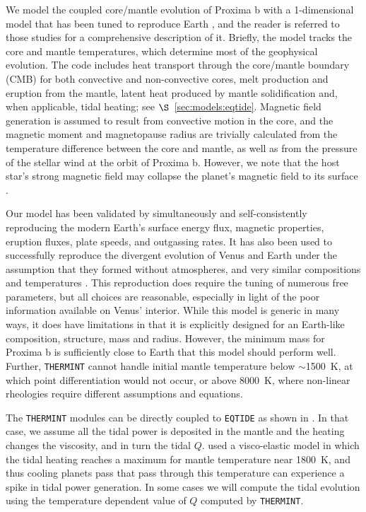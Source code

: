 \documentclass[preprint,12pt]{aastex}
\def\eqtide{\texttt{\footnotesize{EQTIDE}}\xspace}
\def\thermint{\texttt{\footnotesize{THERMINT}}\xspace}
\begin{document}
We model the coupled core/mantle evolution of Proxima b with a
1-dimensional model that has been tuned to reproduce Earth
\citep{DriscollBercovici14,DriscollBarnes15}, and the
reader is referred to those studies for a comprehensive description of
it. Briefly, the model tracks the core and mantle
temperatures, which determine most of the geophysical evolution. The code
includes heat transport through the core/mantle boundary (CMB) for
both convective and non-convective cores, melt production and eruption
from the mantle, latent heat produced by mantle solidification and,
when applicable, tidal heating; see $\S$~\ref{sec:models:eqtide}. Magnetic field
generation is assumed to result from convective motion in the core,
and the magnetic moment and magnetopause radius are trivially
calculated from the temperature difference between the core and
mantle, as well as from the pressure of the stellar wind at the orbit
of Proxima b. However, we note that the host star's strong magnetic field may collapse the planet's magnetic field to its surface \citep{Vidotto13,Cohen14}.

Our model has been validated by simultaneously and self-consistently
reproducing the modern Earth's surface energy flux, magnetic
properties, eruption fluxes, plate speeds, and outgassing rates. It
has also been used to successfully reproduce the divergent evolution
of Venus and Earth under the assumption that they formed without
atmospheres, and very similar compositions and temperatures
\citep{DriscollBercovici13}. This reproduction does require the tuning of
numerous free parameters, but all choices are reasonable, especially
in light of the poor information available on Venus' interior. While
this model is generic in many ways, it does have limitations in that it is
explicitly designed for an Earth-like composition, structure, mass and
radius. However, the minimum mass for Proxima b is sufficiently close to
Earth that this model should perform well. Further, \thermint cannot
handle initial mantle temperature below $\sim$1500~K, at which point
differentiation would not occur, or above 8000~K, where non-linear
rheologies require different assumptions and equations.

The \thermint modules can be directly coupled to \eqtide as shown in
\cite{DriscollBarnes15}. In that case, we assume all the tidal power
is deposited in the mantle and the heating changes the viscosity, and
in turn the tidal $Q$. \cite{DriscollBarnes15} used a visco-elastic
model in which the tidal heating reaches a maximum for mantle
temperature near 1800~K, and thus cooling planets pass that pass
through this temperature can experience a spike in tidal power
generation. In some cases we will compute the tidal evolution using
the temperature dependent value of $Q$ computed by \thermint.
\end{document}
